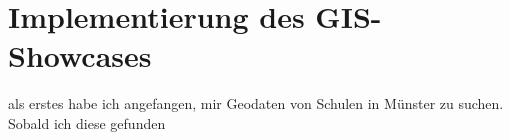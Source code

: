\chapter{Implementierung des GIS-Showcases}

als erstes habe ich angefangen, mir Geodaten von Schulen in Münster zu suchen.
Sobald ich diese gefunden










